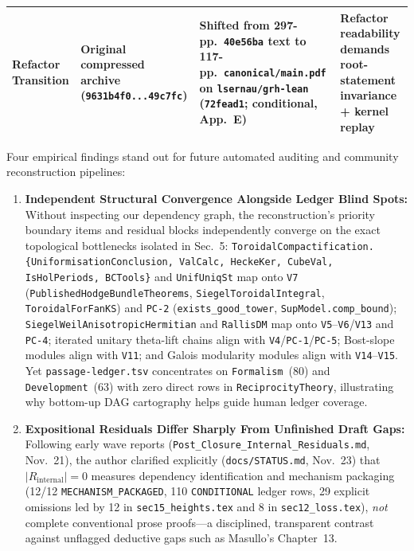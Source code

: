 \documentclass[11pt,a4paper]{article}
\newcommand{\code}[1]{\texttt{\small #1}}
\begin{document}
\begin{table}[!htb]
\begin{tabular}{@{}>{\raggedright\arraybackslash}p{}>{\raggedright\arraybackslash}p{}>{\raggedright\arraybackslash}p{}>{\raggedright\arraybackslash}p{}@{}}
\textbf{Refactor Transition} & Original compressed archive (\texttt{9631b4f0...49c7fc}) & Shifted from 297-pp.\ \texttt{40e56ba} text to 117-pp.\ \texttt{canonical/main.pdf} on \texttt{lsernau/grh-lean} (\texttt{72fead1}; conditional, App.~E) & Refactor readability demands root-statement invariance + kernel replay \\
\bottomrule
\end{tabular}
\end{table}

Four empirical findings stand out for future automated auditing and community reconstruction pipelines:
\begin{enumerate}
  \item \textbf{Independent Structural Convergence Alongside Ledger Blind Spots:} Without inspecting our dependency graph, the reconstruction's priority boundary items and residual blocks independently converge on the exact topological bottlenecks isolated in Sec.~5: \code{Toroidal\allowbreak Compactification.\allowbreak \{UniformisationConclusion, ValCalc, HeckeKer, CubeVal, IsHolPeriods, BCTools\}} and \texttt{UnifUniqSt} map onto \texttt{V7} (\texttt{PublishedHodgeBundleTheorems}, \texttt{SiegelToroidalIntegral}, \texttt{ToroidalForFanKS}) and \texttt{PC-2} (\texttt{exists\_good\_tower}, \texttt{SupModel.comp\_bound}); \code{SiegelWeil\allowbreak Anisotropic\allowbreak Hermitian} and \texttt{RallisDM} map onto \texttt{V5}--\texttt{V6}/\texttt{V13} and \texttt{PC-4}; iterated unitary theta-lift chains align with \texttt{V4}/\texttt{PC-1}/\texttt{PC-5}; Bost-slope modules align with \texttt{V11}; and Galois modularity modules align with \texttt{V14}--\texttt{V15}. Yet \texttt{passage-ledger.tsv} concentrates on \texttt{Formalism}~(80) and \texttt{Development}~(63) with zero direct rows in \texttt{ReciprocityTheory}, illustrating why bottom-up DAG cartography helps guide human ledger coverage.
  \item \textbf{Expositional Residuals Differ Sharply From Unfinished Draft Gaps:} Following early wave reports (\texttt{Post\_Closure\_Internal\_Residuals.md}, Nov.\ 21), the author clarified explicitly (\texttt{docs/STATUS.md}, Nov.\ 23) that $|R_{\mathrm{internal}}| = 0$ measures dependency identification and mechanism packaging (12/12 \texttt{MECHANISM\_PACKAGED}, 110 \texttt{CONDITIONAL} ledger rows, 29 explicit omissions led by 12 in \texttt{sec15\_heights.tex} and 8 in \texttt{sec12\_loss.tex}), \emph{not} complete conventional prose proofs---a disciplined, transparent contrast against unflagged deductive gaps such as Masullo's Chapter~13.

\end{enumerate}
\end{document}
